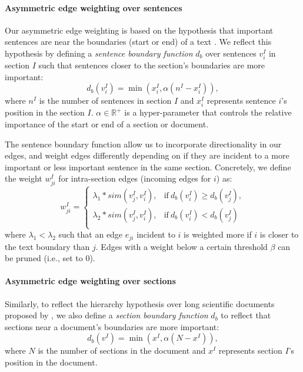 \documentclass[11pt,a4paper]{article}
\begin{document}
\paragraph{Asymmetric edge weighting over sentences}
Our asymmetric edge weighting is based on the hypothesis that important sentences are near the boundaries (start or end) of a text \citep{baxendale1958machine}.  We reflect this hypothesis by defining a \textit{sentence boundary function} $d_b$ over sentences $v^I_i$ in section $I$ such that sentences closer to the section's boundaries are more important:
\begin{equation}
\label{eq:sent_boundary_func}
d_b(v^I_i) = \min(x^I_i,\alpha(n^I-x^I_i)),
\end{equation}
where $n^I$ is the number of sentences in section $I$  and $x^I_i$ represents sentence $i$'s position in the section $I$.  $\alpha \in \mathbb{R}^+$ is a hyper-parameter that controls the relative importance of the start or end of a section or document.   

The sentence boundary function allow us to incorporate directionality in our edges, and weight edges differently depending on if they are incident to a more important or less important sentence in the same section. Concretely, we define the weight $w^I_{ji}$ for intra-section edges (incoming edges for $i$) as:
\begin{equation}\label{eq:sent_boundary_cond}
        w^I_{ji}= 
    \begin{cases}
    \lambda_1*sim(v^I_j, v^I_i), & \textrm{if} \: d_b(v^I_i) \geq d_b(v^I_j),\\
    
    \lambda_2*sim(v^I_j,v^I_i), & \textrm{if} \: d_b(v^I_i) < d_b(v^I_j)\\
    \end{cases}
    \end{equation}
where $\lambda_1 <\lambda_2$ such that an edge $e_{ji}$ incident to $i$ is weighted more if $i$ is closer to the text boundary than $j$. Edges with a weight below a certain threshold $\beta$ can be pruned (i.e., set to $0$). 
    
\paragraph{Asymmetric edge weighting over sections}
Similarly, to reflect the hierarchy hypothesis over long scientific documents proposed by \citet{teufel1997sentence}, we also define a \textit{section boundary function} $d_b$ to reflect that sections near a document's boundaries are more important:
\begin{equation}
\label{eq:sec_boundary_func}
d_b(v^I) = \min(x^I,\alpha(N-x^I)),
\end{equation}
where $N$ is the number of sections in the document  and $x^I$ represents section $I$'s position in the document.  
\end{document}
